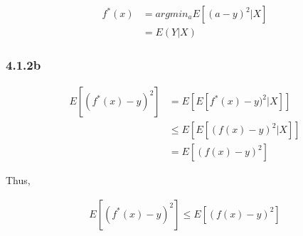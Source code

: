 \documentclass[11pt]{article}
\begin{document}
    \begin{align}
f^*(x) &= argmin_a E[(a-y)^2|X]\\
&= E(Y|X)
\end{align}

    \subsubsection{4.1.2b}\label{b}

    \begin{align}
E[(f^*(x)-y)^2] &= E[E[f^*(x)-y)^2|X]]\\
&\leq E[E[(f(x)-y)^2|X]]\\
&= E[(f(x)-y)^2]
\end{align}

Thus,

\begin{align}
E[(f^*(x)-y)^2] \leq E[(f(x)-y)^2]
\end{align}


    
    
    
    
\end{document}
